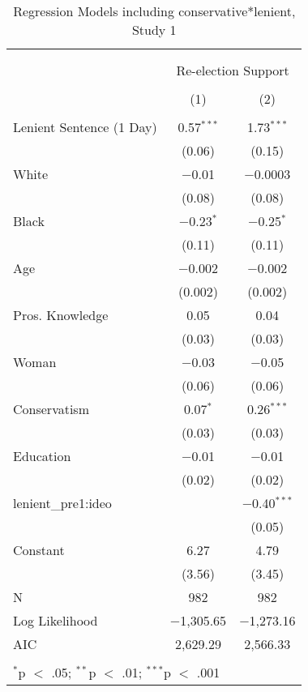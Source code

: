 \documentclass[12pt,letterpaper]{article}
\begin{document}
\begin{table}[!htbp] \centering   \caption{Regression Models including conservative*lenient, Study 1}   \label{} \begin{tabular}{@{\extracolsep{5pt}}lcc} \\[-1.8ex]\hline \\[-1.8ex] \\[-1.8ex] & \multicolumn{2}{c}{Re-election Support} \\ \\[-1.8ex] & (1) & (2)\\ \hline \\[-1.8ex]  Lenient Sentence (1 Day) & 0.57$^{***}$ & 1.73$^{***}$ \\   & (0.06) & (0.15) \\   White & $-$0.01 & $-$0.0003 \\   & (0.08) & (0.08) \\   Black & $-$0.23$^{*}$ & $-$0.25$^{*}$ \\   & (0.11) & (0.11) \\   Age & $-$0.002 & $-$0.002 \\   & (0.002) & (0.002) \\   Pros. Knowledge & 0.05 & 0.04 \\   & (0.03) & (0.03) \\   Woman & $-$0.03 & $-$0.05 \\   & (0.06) & (0.06) \\   Conservatism & 0.07$^{*}$ & 0.26$^{***}$ \\   & (0.03) & (0.03) \\   Education & $-$0.01 & $-$0.01 \\   & (0.02) & (0.02) \\   lenient\_pre1:ideo &  & $-$0.40$^{***}$ \\   &  & (0.05) \\   Constant & 6.27 & 4.79 \\   & (3.56) & (3.45) \\  N & 982 & 982 \\ Log Likelihood & $-$1,305.65 & $-$1,273.16 \\ AIC & 2,629.29 & 2,566.33 \\ \hline \\[-1.8ex] \multicolumn{3}{l}{$^{*}$p $<$ .05; $^{**}$p $<$ .01; $^{***}$p $<$ .001} \\ \end{tabular} \end{table} 
\end{document}
